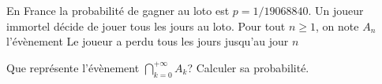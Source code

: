 \documentclass[french,11pt,twoside]{VcCours}
\begin{document}
\begin{Exemple} En France la probabilité de gagner au loto est $p=1/19 068 840$. Un joueur immortel décide de jouer tous les jours au loto. Pour tout $n \geq 1$, on note $A_n$ l'évènement \og Le joueur a perdu tous les jours jusqu'au jour $n$ \fg{} 

Que représente l'évènement $\bigcap_{k=0}^{+\infty\ }A_k$? Calculer sa probabilité.

\end{Exemple}







% 
% 
% 
% 
%
% 
% 
%
%
% 
\end{document}
